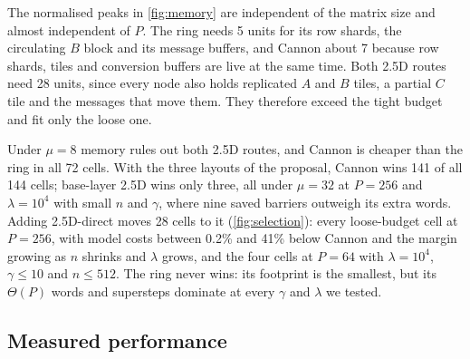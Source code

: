 \documentclass[11pt,a4paper]{article}
\begin{document}
The normalised peaks in \cref{fig:memory} are independent of the matrix size and almost independent of $P$.
The ring needs 5 units for its row shards, the circulating $B$ block and its message buffers, and Cannon
about 7 because row shards, tiles and conversion buffers are live at the same time. Both 2.5D routes need
28 units, since every node also holds replicated $A$ and $B$ tiles, a partial $C$ tile and the messages
that move them. They therefore exceed the tight budget and fit only the loose one.

Under $\mu=8$ memory rules out both 2.5D routes, and Cannon is cheaper than the ring in all 72 cells. With the three layouts of the proposal, Cannon wins 141 of all 144 cells; base-layer 2.5D wins
only three, all under $\mu=32$ at $P=256$ and $\lambda=10^4$ with small $n$ and $\gamma$, where nine saved
barriers outweigh its extra words. Adding 2.5D-direct moves 28 cells to it (\cref{fig:selection}): every
loose-budget cell at $P=256$, with model costs between 0.2\% and 41\% below Cannon and the margin growing
as $n$ shrinks and $\lambda$ grows, and the four cells at $P=64$ with $\lambda=10^4$, $\gamma\le10$ and
$n\le512$. The ring never wins: its footprint is the smallest, but its $\Theta(P)$ words and supersteps
dominate at every $\gamma$ and $\lambda$ we tested.

\subsection{Measured performance}
\label{sec:measure}
\end{document}
